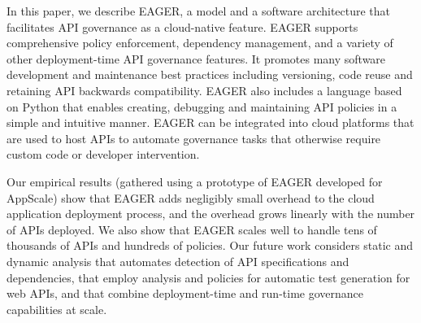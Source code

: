 In this paper, we describe EAGER, a model and a software architecture that 
facilitates API governance as a cloud-native feature. EAGER supports comprehensive policy
enforcement, dependency management, and a variety of other deployment-time API
governance features. It promotes many software development and maintenance
best practices including versioning, code reuse and retaining API backwards
compatibility. EAGER also includes a language based on Python that enables
creating, debugging and maintaining API policies in a simple and intuitive
manner. EAGER can be integrated into cloud platforms that are used to host APIs
to automate governance tasks that otherwise require custom code or developer intervention.

Our empirical results (gathered using a prototype of EAGER developed for AppScale)
show that EAGER adds negligibly small overhead to the cloud application 
deployment process, and the overhead grows linearly
with the number of APIs deployed. We also show that EAGER scales well 
to handle tens of thousands of APIs and hundreds of policies. 
Our future work considers static and dynamic analysis
that automates detection of API specifications and dependencies, that employ 
analysis and policies for automatic test generation for web APIs, and that 
combine deployment-time and run-time governance capabilities at scale.
